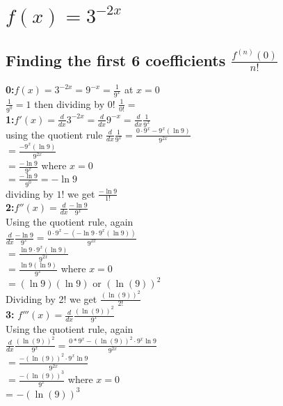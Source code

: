 \documentclass{article}
\begin{document}
\section{$f(x) = 3^{-2x}$}
\begin{multicols*}{2}
    \subsection*{Finding the first 6 coefficients $\frac{f^{(n)}(0)}{n!}$}
    \textbf{0:}$f(x) =  3^{-2x}= 9^{-x} = \frac{1}{9^x}$ at $x=0$
    \\[0.05in]$\frac{1}{9^0}=1$ then dividing by 0! $\frac{1}{0!}=$
    \\[0.05in]\textbf{1:}$f'(x) = \frac{d}{dx} 3^{-2x}=\frac{d}{dx} 9^{-x} =\frac{d}{dx} \frac{1}{9^x}$
    \\[0.1in]using the quotient rule $\frac{d}{dx} \frac{1}{9^x} = \frac{0\cdot9^x-9^x(\ln9)}{9^{2x}}$
    \\[0.1in]$= \frac{-9^x(\ln9)}{9^{2x}}$
    \\[0.1in]$= \frac{-\ln9}{9^{x}}$ where $x=0$
    \\[0.1in]$= \frac{-\ln9}{9^{0}}=-\ln9$
    \\[0in] dividing by $1!$ we get $\boxed{\frac{-\ln9} {1!}}$
    \\[0.1in]\textbf{2:}$f''(x) = \frac{d}{dx} \frac{-\ln9}{9^{x}}$
    \\[0.1in]Using the quotient rule, again \\[0.02in]$\frac{d}{dx} \frac{-\ln9}{9^{x}}= \frac{0\cdot 9^x -(-\ln9\cdot9^x(\ln9))}{9^{2x}}$
    \\[0.1in] $= \frac{\ln9\cdot9^x(\ln9)}{9^{2x}}$
    \\[0.1in] $= \frac{\ln9(\ln9)}{9^{x}}$ where $x=0$
    \\[0.1in] $= (\ln9)(\ln9) $ or $(\ln(9))^2$
    \\[0in]Dividing by 2! we get $\boxed{\frac{(\ln(9))^2}{2!}}$
    \\[0.1in]\textbf{3:} $f'''(x)= \frac{d}{dx} \frac{(\ln(9))^2}{9^{x}}$ 
    \\[0.1in]Using the quotient rule, again \\[0.05in]$\frac{d}{dx} \frac{(\ln(9))^2}{9^{x}} = \frac{0*9^x-(\ln(9))^2\cdot9^x\ln9}{9^{2x}}$ 
    \\[0.1in] $ = \frac{-(\ln(9))^2\cdot9^x\ln9}{9^{2x}}$ 
    \\[0.1in] $ = \frac{-(\ln(9))^3}{9^{x}}$ where $x=0$
    \\[0.1in] = ${-(\ln(9))^3}$

\end{multicols*}
\end{document}
